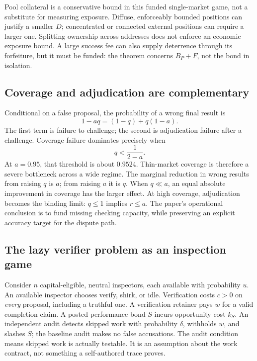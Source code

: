 \documentclass[10pt]{article}
\begin{document}
Pool collateral is a conservative bound in this funded single-market game, not a substitute for measuring exposure. Diffuse, enforceably bounded positions can justify a smaller $D$; concentrated or connected external positions can require a larger one. Splitting ownership across addresses does not enforce an economic exposure bound. A large success fee can also supply deterrence through its forfeiture, but it must be funded: the theorem concerns $B_P+F$, not the bond in isolation.

\subsection{Coverage and adjudication are complementary}

Conditional on a false proposal, the probability of a wrong final result is
\begin{equation}
1-aq=(1-q)+q(1-a).
\label{eq:failure_decomposition}
\end{equation}
The first term is failure to challenge; the second is adjudication failure after a challenge. Coverage failure dominates precisely when
\[
q<\frac{1}{2-a}.
\]
At $a=0.95$, that threshold is about $0.9524$. Thin-market coverage is therefore a severe bottleneck across a wide regime. The marginal reduction in wrong results from raising $q$ is $a$; from raising $a$ it is $q$. When $q\ll a$, an equal absolute improvement in coverage has the larger effect. At high coverage, adjudication becomes the binding limit: $q\leq1$ implies $r\leq a$. The paper's operational conclusion is to fund missing checking capacity, while preserving an explicit accuracy target for the dispute path.

\subsection{The lazy verifier problem as an inspection game}
\label{sec:monitoring}

Consider $n$ capital-eligible, neutral inspectors, each available with probability $u$. An available inspector chooses verify, shirk, or idle. Verification costs $c>0$ on \emph{every} proposal, including a truthful one. A verification retainer pays $w$ for a valid completion claim. A posted performance bond $S$ incurs opportunity cost $k_S$. An independent audit detects skipped work with probability $\delta$, withholds $w$, and slashes $S$; the baseline audit makes no false accusations. The audit condition means skipped work is actually testable. It is an assumption about the work contract, not something a self-authored trace proves.
\end{document}
